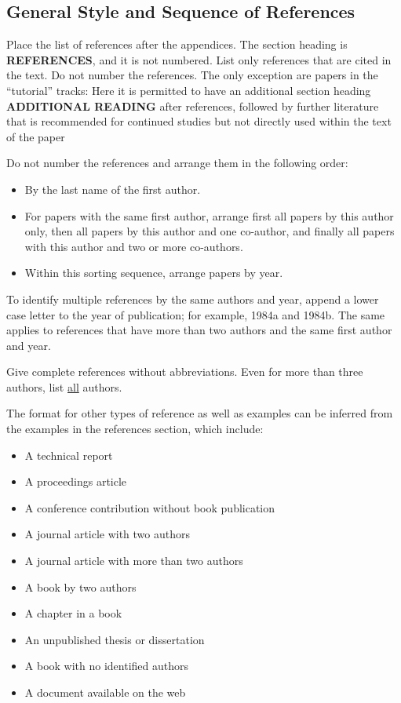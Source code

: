 \documentclass{wscpaperproc}
\theoremstyle{wsc}
\begin{document}
\subsection{General Style and Sequence of References}
Place the list of references after the appendices. The section heading is {\bf REFERENCES}, and it is not numbered. List only references that are cited in the text. Do not number the references. The only exception are papers in the ``tutorial'' tracks: Here it is permitted to have an additional section heading {\bf ADDITIONAL READING} after references, followed by further literature that is recommended for continued studies but not directly used within the text of the paper

Do not number the references and arrange them in the following order:
\begin{itemize}
	\item By the last name of the first author.
	\item For papers with the same first author, arrange first all papers by this author only, then all papers by this author and one co-author, and finally all papers with this author and two or more co-authors.
\item Within this sorting sequence, arrange papers by year.
\end{itemize}

To identify multiple references by the same authors and year, append a lower case letter to the year of publication; for example, 1984a and 1984b. The same applies to references that have more than two authors and the same first author and year. 

Give complete references without abbreviations. Even for more than three authors, list \underline{all} authors. 

The format for other types of reference as well as examples can be inferred from the examples in the references section, which include:
\begin{itemize}
\item A technical report \cite{chi89}
\item A proceedings article \cite{cheng:input94}
\item A conference contribution without book publication 
\item A journal article with two authors \cite{powell2017widening}
\item A journal article with more than two authors 
\item A book by two authors \cite{hammersley:montecarlo}
\item A chapter in a book \cite{sch79}
\item An unpublished thesis or dissertation \cite{ste99}
\item A book with no identified authors \cite{chicago03}
\item A document available on the web \cite{WSC}
\end{itemize}
\end{document}
